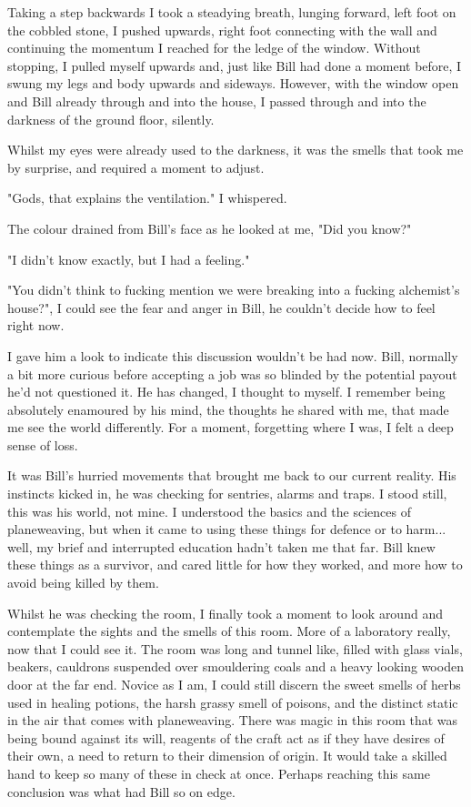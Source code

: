 Taking a step backwards I took a steadying breath, lunging forward, left foot on
the cobbled stone, I pushed upwards, right foot connecting with the wall and
continuing the momentum I reached for the ledge of the window. Without stopping,
I pulled myself upwards and, just like Bill had done a moment before, I swung my
legs and body upwards and sideways. However, with the window open and Bill
already through and into the house, I passed through and into the darkness of
the ground floor, silently.

Whilst my eyes were already used to the darkness, it was the smells that
took me by surprise, and required a moment to adjust.  

\begin{dialogue}
    \item{"Gods, that explains the ventilation." I whispered.}
    \item{The colour drained from Bill's face as he looked at me, "Did you know?"}
    \item{"I didn't know exactly, but I had a feeling."}
    \item{"You didn't think to fucking mention we were breaking into a fucking alchemist's house?", I could see the fear and anger in Bill, he couldn't decide how to feel right now.}
\end{dialogue}

I gave him a look to indicate this discussion wouldn't be had now. Bill,
normally a bit more curious before accepting a job was so blinded by the
potential payout he'd not questioned it. He has changed, I thought to myself. I
remember being absolutely enamoured by his mind, the thoughts he shared with me,
that made me see the world differently. For a moment, forgetting where I was, I
felt a deep sense of loss. 

It was Bill's hurried movements that brought me back to our current reality.
His instincts kicked in, he was checking for sentries, alarms and traps. I stood
still, this was his world, not mine. I understood the basics and the sciences of
planeweaving, but when it came to using these things for defence or to harm...
well, my brief and interrupted education hadn't taken me that far. Bill knew
these things as a survivor, and cared little for how they worked, and more how
to avoid being killed by them.

Whilst he was checking the room, I finally took a moment to look around and
contemplate the sights and the smells of this room. More of a laboratory really,
now that I could see it. The room was long and tunnel like, filled with glass vials, beakers,
cauldrons suspended over smouldering coals and a heavy looking wooden door at
the far end. Novice as I am, I could still
discern the sweet smells of herbs used in healing potions, the harsh grassy
smell of poisons, and the distinct static in the air that comes with
planeweaving. There was magic in this room that was being bound against its
will, reagents of the craft act as if they have desires of their own, a need to
return to their dimension of origin. It would take a skilled hand to keep so
many of these in check at once. Perhaps reaching this same conclusion was what
had Bill so on edge.

